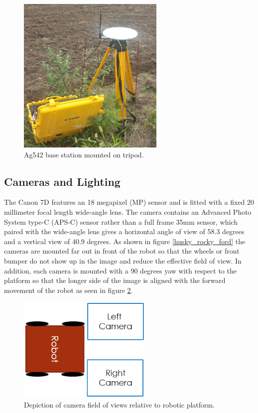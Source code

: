 \begin{figure}[htb]
	\centering
    \includegraphics[height=3in]{figures/sunflower_base_cropped.jpg}
    \caption[Base station]{Ag542 base station mounted on tripod.}
    \label{base_station}
\end{figure}

\subsection{Cameras and Lighting}

The Canon 7D features an 18 megapixel (MP) sensor and is fitted with a fixed 20 millimeter focal length wide-angle lens.  The camera contains an Advanced Photo System type-C (APS-C) sensor rather than a full frame 35mm sensor, which paired with the wide-angle lens gives a horizontal angle of view of 58.3 degrees and a vertical view of 40.9 degrees.  
As shown in figure \ref{husky_rocky_ford} the cameras are mounted far out in front of the robot so that the wheels or front bumper do not show up in the image and reduce the effective field of view.  In addition, each camera is mounted with a 90 degrees yaw with respect to the platform so that the longer side of the image is aligned with the forward movement of the robot as seen in figure \ref{figure:image_fov}. 

\begin{figure}[htb]
	\centering
    \includegraphics[height=2in]{figures/camera_directions.png}
    \caption[Camera field of view]{Depiction of camera field of views relative to robotic platform.}
    \label{figure:image_fov}
\end{figure}

